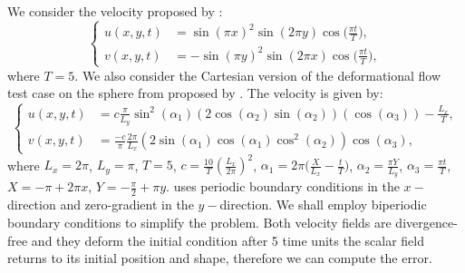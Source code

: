 We consider the velocity proposed by \citet{nair:2010}:
\begin{equation}
	\label{chp3-vf1}
	\begin{cases}
		u(x,y,t) &=  \sin(\pi x)^2\sin(2\pi y)\cos\big(\frac{\pi t}{T}\big),\\
		v(x,y,t) &= -\sin(\pi y)^2\sin(2\pi x)\cos\big(\frac{\pi t}{T}\big),
	\end{cases}
\end{equation}
where $T=5$. We also consider the Cartesian version of the deformational flow test case on the sphere from \citet{nair:2010}
proposed by \citet{chen:2017}. The velocity is given by:
\begin{equation}
	\label{chp3-vf2}
	\begin{cases}
		u(x,y,t) &= c\frac{\pi}{L_y}\sin^2(\alpha_1)(2\cos(\alpha_2)\sin(\alpha_2))(\cos(\alpha_3)) - \frac{L_x}{T},\\
		v(x,y,t) &= \frac{-c}{\pi}\frac{2\pi}{L_x}(2\sin(\alpha_1)\cos(\alpha_1)\cos^2(\alpha_2))\cos(\alpha_3),
	\end{cases}
\end{equation}
where $L_x = 2\pi$, $L_y = \pi$, $T=5$, $c = \frac{10}{T}(\frac{L_x}{2\pi})^2$, $\alpha_1 = 2\pi\big(\frac{X}{L_x}-\frac{t}{T}\big)$, $\alpha_2 = \frac{\pi Y}{L_y}$,
$\alpha_3 =\frac{\pi t}{T}$,  $X = -\pi + 2\pi x $, $Y =-\frac{\pi}{2} +\pi y$. 
\citet{chen:2017} uses periodic boundary conditions in the $x-$direction and zero-gradient in the $y-$direction.
We shall employ biperiodic boundary conditions to simplify the problem.
Both velocity fields are divergence-free and they deform the initial condition after 5 time units the scalar field
returns to its initial position and shape, therefore we can compute the error.

